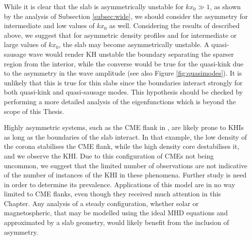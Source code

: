 While it is clear that the slab is asymmetrically unstable for $k x_0 \gg 1$, as shown by the analysis of Subsection \ref{subsec:wide}, we should consider the asymmetry for intermediate and low values of $k x_0$ as well.
Considering the results of \cite{Allcock2017} described above, we suggest that for asymmetric density profiles and for intermediate or large values of $k x_0$, the slab may become asymmetrically unstable.
A quasi-sausage wave would render KH unstable the boundary separating the sparser region from the interior, while the converse would be true for the quasi-kink due to the asymmetry in the wave amplitude (see also Figure \ref{fig:quasimodes}).
It is unlikely that this is true for thin slabs since the boundaries interact strongly for both quasi-kink and quasi-sausage modes.
This hypothesis should be checked by performing a more detailed analysis of the eigenfunctions which is beyond the scope of this Thesis.

Highly asymmetric systems, such as the CME flank in \cite{Foullon2011}, are likely prone to KHIs as long as the boundaries of the slab interact.
In that example, the low density of the corona stabilises the CME flank, while the high density core destabilises it, and we observe the KHI.
Due to this configuration of CMEs not being uncommon, we suggest that the limited number of observations are not indicative of the number of instances of the KHI in these phenomena.
Further study is need in order to determine its prevalence.
Applications of this model are in no way limited to CME flanks, even though they received much attention in this Chapter.
Any analysis of a steady configuration, whether solar or magnetospheric, that may be modelled using the ideal MHD equations and approximated by a slab geometry, would likely benefit from the inclusion of asymmetry.

